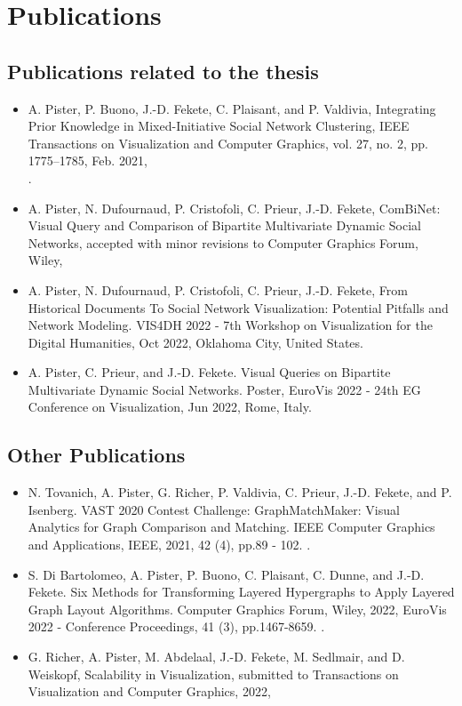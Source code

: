\chapter*{Publications}

\section*{Publications related to the thesis}

\begin{itemize}
    \item A. Pister, P. Buono, J.-D. Fekete, C. Plaisant, and P. Valdivia, Integrating Prior Knowledge in Mixed-Initiative Social Network Clustering, IEEE Transactions on Visualization and Computer Graphics, vol. 27, no. 2, pp. 1775–1785, Feb. 2021,\\ .
    \item A. Pister, N. Dufournaud, P. Cristofoli, C. Prieur, J.-D. Fekete, ComBiNet: Visual Query and Comparison of Bipartite Multivariate Dynamic Social Networks, accepted with minor revisions to Computer Graphics Forum, Wiley, 
    \item A. Pister, N. Dufournaud, P. Cristofoli, C. Prieur, J.-D. Fekete, From Historical Documents To Social Network Visualization: Potential Pitfalls and Network Modeling. VIS4DH 2022 - 7th Workshop on Visualization for the Digital Humanities, Oct 2022, Oklahoma City, United States.
    \item  A. Pister, C. Prieur, and J.-D. Fekete. Visual Queries on Bipartite Multivariate Dynamic Social Networks. Poster, EuroVis 2022 - 24th EG Conference on Visualization, Jun 2022, Rome, Italy. 
\end{itemize}


\section*{Other Publications}

\begin{itemize}
    \item N. Tovanich, A. Pister, G. Richer, P. Valdivia, C. Prieur, J.-D. Fekete, and P. Isenberg. VAST 2020 Contest Challenge: GraphMatchMaker: Visual Analytics for Graph Comparison and Matching. IEEE Computer Graphics and Applications, IEEE, 2021, 42 (4), pp.89 - 102. .
    \item S. Di Bartolomeo, A. Pister, P. Buono, C. Plaisant, C. Dunne, and J.-D. Fekete. Six Methods for Transforming Layered Hypergraphs to Apply Layered Graph Layout Algorithms. Computer Graphics Forum, Wiley, 2022, EuroVis 2022 - Conference Proceedings, 41 (3), pp.1467-8659.  .
    \item G. Richer, A. Pister, M. Abdelaal, J.-D. Fekete, M. Sedlmair, and D. Weiskopf, Scalability in Visualization, submitted to Transactions on Visualization and Computer Graphics, 2022, 
\end{itemize}
